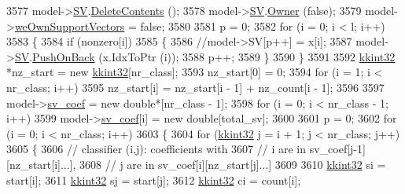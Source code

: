 \begin{DoxyCode}
{{3577     model->\hyperlink{struct_s_v_m289___m_f_s_1_1_svm___model_ab2ebe759ca5aabb85fc6deea03706f0a}{SV}.\hyperlink{class_k_k_b_1_1_k_k_queue_a72dbe1e65d567536dbf4be3617230254}{DeleteContents} ();
3578     model->\hyperlink{struct_s_v_m289___m_f_s_1_1_svm___model_ab2ebe759ca5aabb85fc6deea03706f0a}{SV}.\hyperlink{class_k_k_b_1_1_k_k_queue_a4990d037ff09dd504cc7df53819bf61a}{Owner} (\textcolor{keyword}{false});
3579     model->\hyperlink{struct_s_v_m289___m_f_s_1_1_svm___model_a92c6022c1bf0e7094d7815692f3ec0e9}{weOwnSupportVectors} = \textcolor{keyword}{false};
3580 
3581     p = 0;
3582     \textcolor{keywordflow}{for}  (i = 0;  i < l;  i++)
3583     \{
3584       \textcolor{keywordflow}{if}  (nonzero[i])
3585       \{
3586         \textcolor{comment}{//model->SV[p++] = x[i];}
3587         model->\hyperlink{struct_s_v_m289___m_f_s_1_1_svm___model_ab2ebe759ca5aabb85fc6deea03706f0a}{SV}.\hyperlink{class_k_k_m_l_l_1_1_feature_vector_list_abd43779a90a6aa3db1de8092be877bdb}{PushOnBack} (x.IdxToPtr (i));
3588         p++;
3589       \}
3590     \}
3591 
3592     \hyperlink{namespace_k_k_b_a8fa4952cc84fda1de4bec1fbdd8d5b1b}{kkint32} *nz\_start = \textcolor{keyword}{new} \hyperlink{namespace_k_k_b_a8fa4952cc84fda1de4bec1fbdd8d5b1b}{kkint32}[nr\_class];
3593     nz\_start[0] = 0;
3594     \textcolor{keywordflow}{for}  (i = 1;  i < nr\_class;  i++)
3595       nz\_start[i] = nz\_start[i - 1] + nz\_count[i - 1];
3596 
3597     model->\hyperlink{struct_s_v_m289___m_f_s_1_1_svm___model_afc428150716a2373a251c57f7e68bad3}{sv\_coef} = \textcolor{keyword}{new} \textcolor{keywordtype}{double}*[nr\_class - 1];
3598     \textcolor{keywordflow}{for}  (i = 0;  i < nr\_class - 1;  i++)
3599       model->\hyperlink{struct_s_v_m289___m_f_s_1_1_svm___model_afc428150716a2373a251c57f7e68bad3}{sv\_coef}[i] = \textcolor{keyword}{new} \textcolor{keywordtype}{double}[total\_sv];
3600 
3601     p = 0;
3602     for  (i = 0;  i < nr\_class;  i++)
3603     \{
3604       \textcolor{keywordflow}{for}  (\hyperlink{namespace_k_k_b_a8fa4952cc84fda1de4bec1fbdd8d5b1b}{kkint32} j = i + 1;  j < nr\_class;  j++)
3605       \{
3606         \textcolor{comment}{// classifier (i,j): coefficients with}
3607         \textcolor{comment}{// i are in sv\_coef[j-1][nz\_start[i]...],}
3608         \textcolor{comment}{// j are in sv\_coef[i][nz\_start[j]...]}
3609 
3610         \hyperlink{namespace_k_k_b_a8fa4952cc84fda1de4bec1fbdd8d5b1b}{kkint32} si = start[i];
3611         \hyperlink{namespace_k_k_b_a8fa4952cc84fda1de4bec1fbdd8d5b1b}{kkint32} sj = start[j];
3612         \hyperlink{namespace_k_k_b_a8fa4952cc84fda1de4bec1fbdd8d5b1b}{kkint32} ci = count[i];
}}
\end{DoxyCode}
